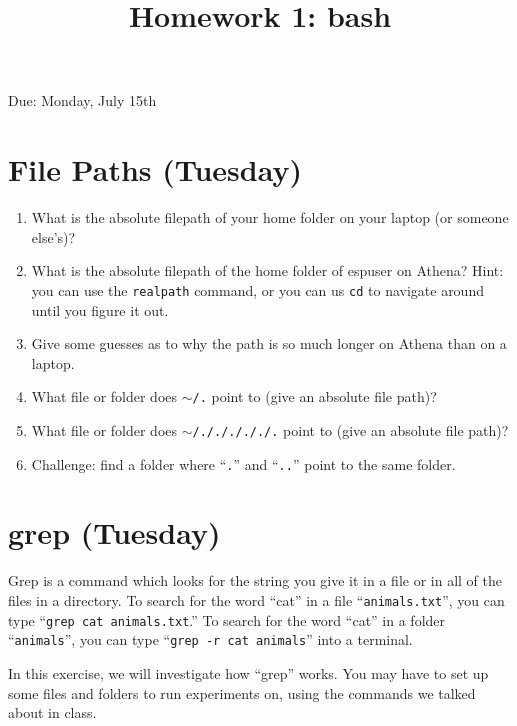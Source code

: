 \documentclass{article}
\title{Homework 1:  bash}
\begin{document}
\maketitle

Due:  Monday, July 15th

\section{File Paths (Tuesday)}
\begin{enumerate}[a]
\item What is the absolute filepath of your home folder on your laptop (or someone else's)?
\item What is the absolute filepath of the home folder of espuser on Athena?  Hint:  you can use the \texttt{realpath} command, or you can us \texttt{cd} to navigate around until you figure it out.
\item Give some guesses as to why the path is so much longer on Athena than on a laptop.
\item What file or folder does \texttt{$\sim$/.} point to (give an absolute file path)?
\item What file or folder does \texttt{$\sim$/./././././.} point to (give an absolute file path)?
\item Challenge:  find a folder where ``\texttt{.}'' and ``\texttt{..}'' point to the same folder.
\end{enumerate}



\section{grep (Tuesday)}
Grep is a command which looks for the string you give it in a file or in all of the files in a directory.  To search for the word ``cat'' in a file ``\texttt{animals.txt}'', you can type ``\texttt{grep cat animals.txt}.''  To search for the word ``cat'' in a folder ``\texttt{animals}'', you can type ``\texttt{grep -r cat animals}'' into a terminal.

In this exercise, we will investigate how ``grep'' works.  You may have to set up some files and folders to run experiments on, using the commands we talked about in class.
\end{document}
